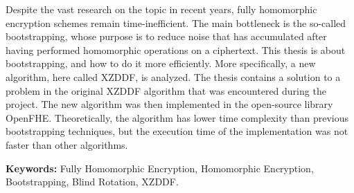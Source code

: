 Despite the vast research on the topic in recent years, fully homomorphic encryption schemes remain time-inefficient. The main bottleneck is the so-called bootstrapping, whose purpose is to reduce noise that has accumulated after having performed homomorphic operations on a ciphertext. This thesis is about bootstrapping, and how to do it more efficiently. More specifically, a new algorithm, here called XZDDF, is analyzed. The thesis contains a solution to a problem in the original XZDDF algorithm that was encountered during the project. The new algorithm was then implemented in the open-source library OpenFHE. Theoretically, the algorithm has lower time complexity than previous bootstrapping techniques, but the execution time of the implementation was not faster than other algorithms.


\textbf{Keywords:} Fully Homomorphic Encryption, Homomorphic Encryption, Bootstrapping, Blind Rotation, XZDDF.
